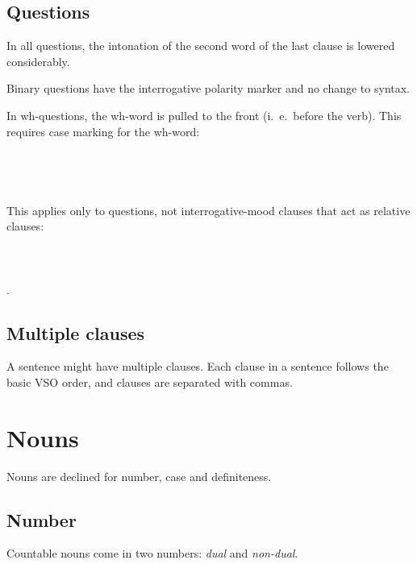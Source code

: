 \documentclass{book}
\begin{document}
\section{Questions}

In all questions, the intonation of the second word of the last clause is lowered considerably.

Binary questions have the interrogative polarity marker and no change to syntax.

In wh-questions, the wh-word is pulled to the front (i.~e.~before the verb). This requires case marking for the wh-word: \\
~\\
 \\
   \\
    \\

This applies only to questions, not interrogative-mood clauses that act as relative clauses: \\
~\\
 \\
     \\
    .

\section{Multiple clauses}

A sentence might have multiple clauses. Each clause in a sentence follows the basic VSO order, and clauses are separated with commas.

\chapter{Nouns}

Nouns are declined for number, case and definiteness.

\section{Number}

Countable nouns come in two numbers: \emph{dual} and \emph{non-dual}.
\end{document}
